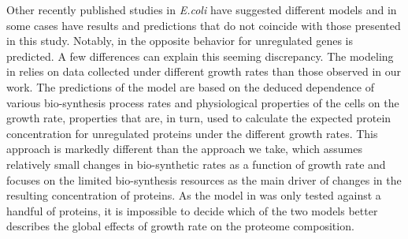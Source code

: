 Other recently published studies in \emph{E.coli} have suggested different models and in some cases have results  and predictions that do not coincide with those presented in this study.
Notably, in \cite{Klumpp2009a} the opposite behavior for unregulated genes is predicted.
A few differences can explain this seeming discrepancy.
The modeling in \cite{Klumpp2009a} relies on data collected under different growth rates than those observed in our work.
The predictions of the model are based on the deduced dependence of various bio-synthesis process rates and physiological properties of the cells on the growth rate, properties that are, in turn, used to calculate the expected protein concentration for unregulated proteins under the different growth rates.
This approach is markedly different than the approach we take, which assumes relatively small changes in bio-synthetic rates as a function of growth rate and focuses on the limited bio-synthesis resources as the main driver of changes in the resulting concentration of proteins.
As the model in \cite{Klumpp2009a} was only tested against a handful of proteins, it is impossible to decide which of the two models better describes the global effects of growth rate on the proteome composition.